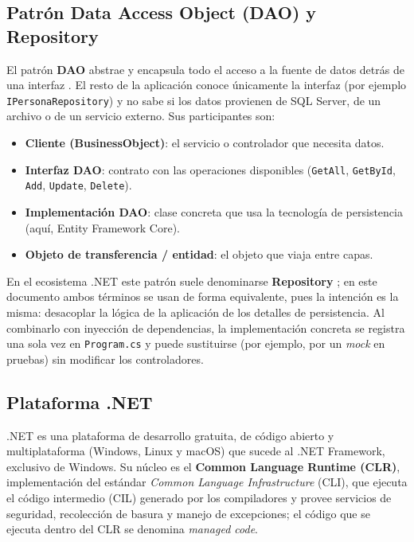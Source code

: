 \documentclass[12pt,letterpaper]{article}
\begin{document}
\subsection{Patrón Data Access Object (DAO) y Repository}
El patrón \textbf{DAO} abstrae y encapsula todo el acceso a la fuente de datos detrás de
una interfaz \cite{corej2ee}. El resto de la aplicación conoce únicamente la interfaz
(por ejemplo \texttt{IPersonaRepository}) y no sabe si los datos provienen de SQL Server,
de un archivo o de un servicio externo. Sus participantes son:

\begin{itemize}[itemsep=2pt]
  \item \textbf{Cliente (BusinessObject)}: el servicio o controlador que necesita datos.
  \item \textbf{Interfaz DAO}: contrato con las operaciones disponibles
        (\texttt{GetAll}, \texttt{GetById}, \texttt{Add}, \texttt{Update}, \texttt{Delete}).
  \item \textbf{Implementación DAO}: clase concreta que usa la tecnología de persistencia
        (aquí, Entity Framework Core).
  \item \textbf{Objeto de transferencia / entidad}: el objeto que viaja entre capas.
\end{itemize}

En el ecosistema .NET este patrón suele denominarse \textbf{Repository} \cite{fowler}; en
este documento ambos términos se usan de forma equivalente, pues la intención es la misma:
desacoplar la lógica de la aplicación de los detalles de persistencia. Al combinarlo con
inyección de dependencias, la implementación concreta se registra una sola vez en
\texttt{Program.cs} y puede sustituirse (por ejemplo, por un \emph{mock} en pruebas) sin
modificar los controladores.

\subsection{Plataforma .NET}
.NET es una plataforma de desarrollo gratuita, de código abierto y multiplataforma
(Windows, Linux y macOS) que sucede al .NET Framework, exclusivo de Windows. Su núcleo es
el \textbf{Common Language Runtime (CLR)}, implementación del estándar \emph{Common
Language Infrastructure} (CLI), que ejecuta el código intermedio (CIL) generado por los
compiladores y provee servicios de seguridad, recolección de basura y manejo de
excepciones; el código que se ejecuta dentro del CLR se denomina \emph{managed code}.
\end{document}
